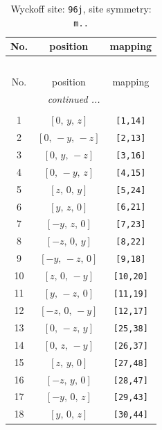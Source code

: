 \documentclass[fleqn,8pt]{jsarticle}
\begin{document}
\begin{longtable}{ccc}
\caption{Wyckoff site: {\tt 96j}, site symmetry: {\tt m..}}
 \\
 \hline \hline
No. & position & mapping \\ \hline \endfirsthead

\multicolumn{2}{l}{\tablename\ \thetable{}} \\
 \hline \hline
No. & position & mapping \\ \hline \endhead

 \hline \hline
\multicolumn{2}{r}{\footnotesize\it continued ...} \\ \endfoot

 \hline \hline
\multicolumn{2}{r}{} \\ \endlastfoot

1 & $\left[ 0,\, y,\, z \right]$ & {\tt [1,14]} \\ \hline
2 & $\left[ 0,\, - y,\, - z \right]$ & {\tt [2,13]} \\ \hline
3 & $\left[ 0,\, y,\, - z \right]$ & {\tt [3,16]} \\ \hline
4 & $\left[ 0,\, - y,\, z \right]$ & {\tt [4,15]} \\ \hline
5 & $\left[ z,\, 0,\, y \right]$ & {\tt [5,24]} \\ \hline
6 & $\left[ y,\, z,\, 0 \right]$ & {\tt [6,21]} \\ \hline
7 & $\left[ - y,\, z,\, 0 \right]$ & {\tt [7,23]} \\ \hline
8 & $\left[ - z,\, 0,\, y \right]$ & {\tt [8,22]} \\ \hline
9 & $\left[ - y,\, - z,\, 0 \right]$ & {\tt [9,18]} \\ \hline
10 & $\left[ z,\, 0,\, - y \right]$ & {\tt [10,20]} \\ \hline
11 & $\left[ y,\, - z,\, 0 \right]$ & {\tt [11,19]} \\ \hline
12 & $\left[ - z,\, 0,\, - y \right]$ & {\tt [12,17]} \\ \hline
13 & $\left[ 0,\, - z,\, y \right]$ & {\tt [25,38]} \\ \hline
14 & $\left[ 0,\, z,\, - y \right]$ & {\tt [26,37]} \\ \hline
15 & $\left[ z,\, y,\, 0 \right]$ & {\tt [27,48]} \\ \hline
16 & $\left[ - z,\, y,\, 0 \right]$ & {\tt [28,47]} \\ \hline
17 & $\left[ - y,\, 0,\, z \right]$ & {\tt [29,43]} \\ \hline
18 & $\left[ y,\, 0,\, z \right]$ & {\tt [30,44]} \\ \hline

\end{longtable}
\end{document}
